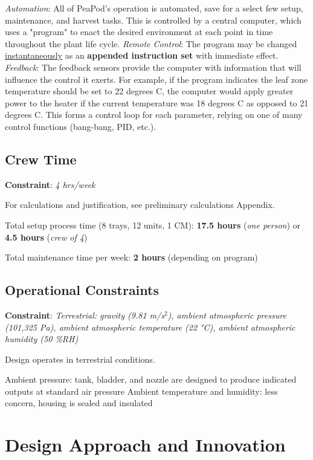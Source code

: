 \documentclass{../tex/report}
\begin{document}
\textit{Automation}: All of PeaPod's operation is automated, save for a select few setup, maintenance, and harvest tasks. This is controlled by a central computer, which uses a "program" to enact the desired environment at each point in time throughout the plant life cycle. 
\textit{Remote Control}: The program may be changed \uline{instantaneously} as an \textbf{appended instruction set} with immediate effect.
\textit{Feedback}: The feedback sensors provide the computer with information that will influence the control it exerts. For example, if the program indicates the leaf zone temperature should be set to 22 degrees C, the computer would apply greater power to the heater if the current temperature was 18 degrees C as opposed to 21 degrees C. This forms a control loop for each parameter, relying on one of many control functions (bang-bang, PID, etc.).


\subsection{Crew Time}

\textbf{Constraint}: \textit{4 hrs/week}

For calculations and justification, see preliminary calculations Appendix.

Total setup process time (8 trays, 12 units, 1 CM): \textbf{17.5 hours} (\textit{one person}) or \textbf{4.5 hours} (\textit{crew of 4})

Total maintenance time per week: \textbf{2 hours} (depending on program)

\subsection{Operational Constraints}

\textbf{Constraint}: \textit{Terrestrial: gravity (9.81 m/s${}^2$), ambient atmospheric pressure (101,325 Pa), ambient atmospheric temperature (22 °C), ambient atmospheric humidity (50 \%RH)}

Design operates in terrestrial conditions.

Ambient pressure: tank, bladder, and nozzle are designed to produce indicated outputs at standard air pressure
Ambient temperature and humidity: less concern, housing is sealed and insulated

\section{Design Approach and Innovation}
\end{document}
